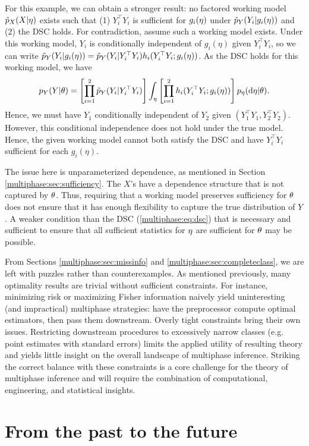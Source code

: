 For this example, we can obtain a stronger result: no factored working model $\tilde{p}_X(X |\eta)$ exists such that (1) $Y_i^\top Y_i$ is sufficient for $g_i(\eta)$ under $\tilde{p}_Y(Y_i | g_i(\eta))$ and (2) the DSC holds.
For contradiction, assume such a working model exists.
Under this working model, $Y_i$ is conditionally independent of $g_i(\eta)$ given $Y_i^\top Y_i$, so we can write $\tilde{p}_Y(Y_i | g_i(\eta)) = \tilde{p}_Y(Y_i | Y_i^\top Y_i) h_i(Y_i^\top Y_i; g_i(\eta))$.
As the DSC holds for this working model, we have
$$p_Y(Y | \theta) = \left[ \prod_{i=1}^2 \tilde{p}_Y(Y_i | Y_i^\top Y_i) \right] \int_{\eta} \left[ \prod_{i=1}^2 h_i(Y_i^\top Y_i; g_i(\eta)) \right] p_\eta(\mathrm{d}\eta | \theta) .
$$
Hence, we must have $Y_1$ conditionally independent of $Y_2$ given $(Y_1^\top Y_1, Y_2^\top Y_2)$.
However, this conditional independence does not hold under the true model.
Hence, the given working model cannot both satisfy the DSC and have $Y_i^\top Y_i$ sufficient for each $g_i(\eta)$. 

The issue here is unparameterized dependence, as mentioned in Section \ref{multiphase:sec:sufficiency}.
The $X$'s have a dependence structure that is not captured by $\theta$.
Thus, requiring that a working model preserves sufficiency for $\theta$ does not ensure that it has enough flexibility to capture the true distribution of $Y$.
A weaker condition than the DSC (\ref{multiphase:eq:dsc}) that is necessary and sufficient to ensure that all sufficient statistics for $\eta$ are sufficient for $\theta$ may be possible.

From Sections \ref{multiphase:sec:missinfo} and \ref{multiphase:sec:completeclass}, we are left with puzzles rather than counterexamples.
As mentioned previously, many optimality results are trivial without sufficient constraints.
For instance, minimizing risk or maximizing Fisher information naively yield uninteresting (and impractical) multiphase strategies: have the preprocessor compute optimal estimators, then pass them downstream.
Overly tight constraints bring their own issues.
Restricting downstream procedures to excessively narrow classes (e.g. point estimates with standard errors) limits the applied utility of resulting theory and yields little insight on the overall landscape of multiphase inference.
Striking the correct balance with these constraints is a core challenge for the theory of multiphase inference and will require the combination of computational, engineering, and statistical insights.

\section{From the past to the future }
\label{multiphase:sec:remarks}

